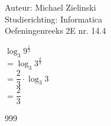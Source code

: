 \documentclass[a4paper]{article}
\begin{document}
  
\noindent \large Auteur: Michael Zielinski \\
\noindent \large Studierichting: Informatica \\
\noindent \large Oefeningenreeks 2E nr. 14.4 \\

\medskip

\normalsize

$ \log_3 9^{ \tfrac{1}{3} } $ \\

$  = \log_3  3^{ \tfrac{2}{3} } $ \\

$ = \dfrac{2}{3} \cdot  \log_3 3 $\\

$ = \dfrac{2}{3} $ \\


\begin{thebibliography}{999}
\end{thebibliography}
\end{document}
